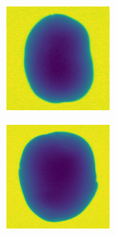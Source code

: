 \documentclass[11pt]{article}
\begin{document}
\begin{figure}[!h]
\begin{subfigure}[b]{0.22\textwidth}
         \caption{}
         \label{fig:perfect_15}
     \end{subfigure}
          \\
    \begin{subfigure}[b]{0.22\textwidth}
         \centering
         \includegraphics[width=\textwidth]{figurer/potato_dataset/perfect/perfect_16.jpg}
         \caption{}
         \label{fig:perfect_16}
     \end{subfigure}
     \hfill
     \begin{subfigure}[b]{0.22\textwidth}
         \centering
         \includegraphics[width=\textwidth]{figurer/potato_dataset/perfect/perfect_17.jpg}

\end{subfigure}
\end{figure}
\end{document}
